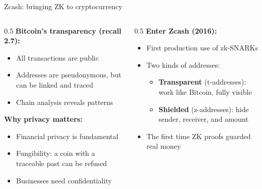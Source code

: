 \ifdefined\PRESENTATION\else\PassOptionsToClass{handout}{beamer}\fi\documentclass[aspectratio=169, lualatex]{beamer}
\begin{document}
\begin{frame}{Zcash: bringing ZK to cryptocurrency}
	\begin{columns}[c]
		\begin{column}{0.5\textwidth}
			\textbf{Bitcoin's transparency (recall 2.7):}
			\begin{itemize}
				\item All transactions are public
				\item Addresses are pseudonymous, but can be linked and traced
				\item Chain analysis reveals patterns
			\end{itemize}
			\textbf{Why privacy matters:}
			\begin{itemize}
				\item Financial privacy is fundamental
				\item Fungibility: a coin with a traceable past can be refused
				\item Businesses need confidentiality
			\end{itemize}
		\end{column}
		\begin{column}{0.5\textwidth}
			\textbf{Enter Zcash (2016):}
			\begin{itemize}
				\item First production use of zk-SNARKs
				\item Two kinds of addresses:
				      \begin{itemize}
					      \item \textbf{Transparent} (t-addresses): work like Bitcoin, fully visible
					      \item \textbf{Shielded} (z-addresses): hide sender, receiver, and amount
				      \end{itemize}
				\item The first time ZK proofs guarded real money
			\end{itemize}
		\end{column}
	\end{columns}
\end{frame}
\end{document}
